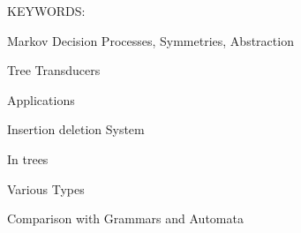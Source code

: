 \noindent KEYWORDS: \hspace*{0.5em} \parbox[t]{4.4in}{Markov Decision Processes,
Symmetries, Abstraction}

\vspace*{24pt}

Tree Transducers

	Applications

Insertion deletion System

	In trees

	Various Types

	Comparison with Grammars and Automata


